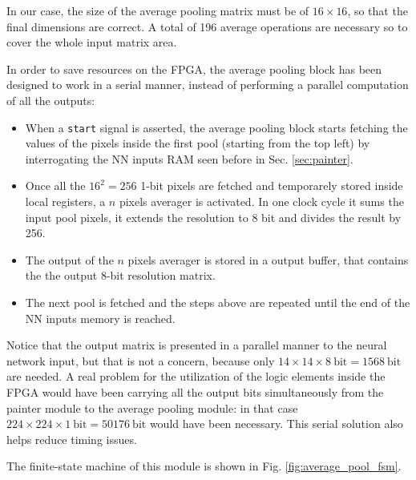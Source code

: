 \documentclass[11pt]{report}
\begin{document}
In our case, the size of the average pooling matrix must be of $16\times16$, so that the final dimensions are correct. A total of 196 average operations are necessary so to cover the whole input matrix area.

In order to save resources on the FPGA, the average pooling block has been designed to work in a serial manner, instead of performing a parallel computation of all the outputs:
\begin{itemize}
    \item When a \texttt{start} signal is asserted, the average pooling block starts fetching the values of the pixels inside the first pool (starting from the top left) by interrogating the NN inputs RAM seen before in Sec. \ref{sec:painter}.
    \item Once all the $16^2=256$ 1-bit pixels are fetched and temporarely stored inside local registers, a $n$ pixels averager is activated. In one clock cycle it sums the input pool pixels, it extends the resolution to 8 bit and divides the result by 256.
    \item The output of the $n$ pixels averager is stored in a output buffer, that contains the the output 8-bit resolution matrix.
    \item The next pool is fetched and the steps above are repeated until the end of the NN inputs memory is reached.
\end{itemize}

Notice that the output matrix is presented in a parallel manner to the neural network input, but that is not a concern, because only $14\times14\times8\ \text{bit}=1568\ \text{bit}$ are needed. A real problem for the utilization of the logic elements inside the FPGA would have been carrying all the output bits simultaneously from the painter module to the average pooling module: in that case $224\times224\times1\ \text{bit}=50176\ \text{bit}$ would have been necessary. This serial solution also helps reduce timing issues.

The finite-state machine of this module is shown in Fig. \ref{fig:average_pool_fsm}.
\end{document}
